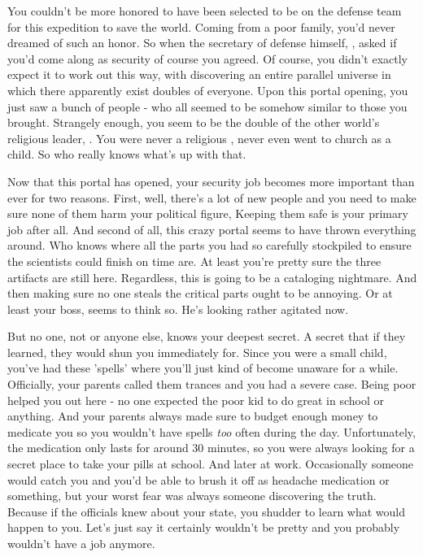 \documentclass[char]{guildcamp3}
\begin{document}
\name{\cSpecOpTwo{}}



You couldn't be more honored to have been selected to be on the defense team for this expedition to save the world. Coming from a poor family, you'd never dreamed of such an honor. So when the secretary of defense himself, \cPoliOne{\intro}, asked if you'd come along as security of course you agreed. Of course, you didn't exactly expect it to work out this way, with discovering an entire parallel universe in which there apparently exist doubles of everyone. Upon this portal opening, you just saw a bunch of people - who all seemed to be somehow similar to those you brought. Strangely enough, you seem to be the double of the other world's religious leader, \cPaladin{\intro}. You were never a religious \cSpecOpTwo{\human}, never even went to church as a child. So who really knows what's up with that.

Now that this portal has opened, your security job becomes more important than ever for two reasons. First, well, there's a lot of new people and you need to make sure none of them harm your political figure, \cPoliOne{} Keeping them safe is your primary job after all. And second of all, this crazy portal seems to have thrown everything around. Who knows where all the parts you had so carefully stockpiled to ensure the scientists could finish on time are. At least you're pretty sure the three artifacts are still here. Regardless, this is going to be a cataloging nightmare. And then making sure no one steals the critical parts ought to be annoying. Or at least your boss, \cSpecOpOne{\intro} seems to think so. He's looking rather agitated now. 

But no one, not \cPoliOne{} or anyone else, knows your deepest secret. A secret that if they learned, they would shun you immediately for. Since you were a small child, you've had these 'spells' where you'll just kind of become unaware for a while. Officially, your parents called them trances and you had a severe case. Being poor helped you out here - no one expected the poor kid to do great in school or anything. And your parents always made sure to budget enough money to medicate you so you wouldn't have spells \emph{too} often during the day. Unfortunately, the medication only lasts for around 30 minutes, so you were always looking for a secret place to take your pills at school. And later at work. Occasionally someone would catch you and you'd be able to brush it off as headache medication or something, but your worst fear was always someone discovering the truth. Because if the officials knew about your state, you shudder to learn what would happen to you. Let's just say it certainly wouldn't be pretty and you probably wouldn't have a job anymore.
\end{document}
